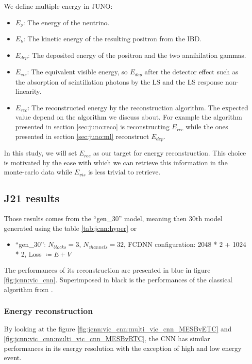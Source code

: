 We define multiple energy in JUNO:
\begin{itemize}
  \item $E_\nu$: The energy of the neutrino.
  \item $E_k$: The kinetic energy of the resulting positron from the IBD.
  \item $E_{dep}$: The deposited energy of the positron and the two annihilation gammas.
  \item $E_{vis}$: The equivalent visible energy, so $E_{dep}$ after the detector effect such as the absorption of scintillation photons by the LS and the LS response non-linearity.
  \item $E_{rec}$: The reconstructed energy by the reconstruction algorithm. The expected value depend on the algorithm we discuss about. For example the algorithm presented in section \ref{sec:juno:reco} is reconstructing $E_{rec}$ while the ones presented in section \ref{sec:juno:ml} reconstruct $E_{dep}$.
\end{itemize}

In this study, we will set $E_{rec}$ as our target for energy reconstruction. This choice is motivated by the ease with which we can retrieve this information in the monte-carlo data while $E_{vis}$ is less trivial to retrieve.

\subsection{J21 results}

Those results comes from the ``gen\_30'' model, meaning then 30th model generated using the table \ref{tab:jcnn:hyper} or
\begin{itemize}
 \item ``gen\_30'': $N_{blocks} = 3$, $N_{channels} = 32$, FCDNN configuration: 2048 * 2 + 1024 * 2, Loss $\coloneq E+V$
\end{itemize}

The performances of its reconstruction are presented in blue in figure \ref{fig:jcnn:vic_cnn}. Superimposed in black is the performances of the classical algorithm from \cite{lebrin_towards_2022}.

\subsubsection{Energy reconstruction}

By looking at the figure \ref{fig:jcnn:vic_cnn:multi_vic_cnn_MESBvETC} and \ref{fig:jcnn:vic_cnn:multi_vic_cnn_MESBvRTC}, the CNN has similar performances in its energy resolution with the exception of high and low energy event.

